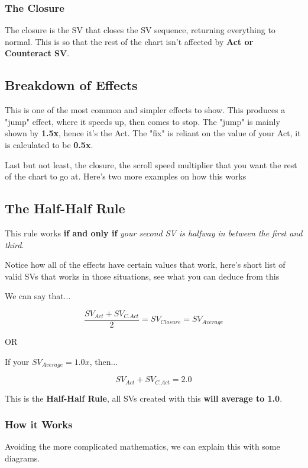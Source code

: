 \subsubsection{The Closure}
The closure is the SV that closes the SV sequence, returning everything to normal. This is so that the rest of the chart isn't affected by \textbf{Act or Counteract SV}.

\subsection{Breakdown of Effects}



This is one of the most common and simpler effects to show. This produces a "jump" effect, where it speeds up, then comes to stop. The "jump" is mainly shown by \textbf{1.5x}, hence it's the Act. The "fix" is reliant on the value of your Act, it is calculated to be \textbf{0.5x}.

Last but not least, the closure, the scroll speed multiplier that you want the rest of the chart to go at. \newline
Here's two more examples on how this works




\subsection{The Half-Half Rule}

This rule works \textbf{if and only if} \textit{your second SV is halfway in between the first and third}.

Notice how all of the effects have certain values that work, here's short list of valid SVs that works in those situations, see what you can deduce from this



We can say that...

\[ \frac{SV_{Act} + SV_{C.Act}}{2} = SV_{Closure} = SV_{Average} \]

OR

If your $SV_{Average} = 1.0x$, then...

\[ SV_{Act} + SV_{C.Act} = 2.0 \]

This is the \textbf{Half-Half Rule}, all SVs created with this \textbf{will average to 1.0}. 
\newpage

\subsubsection{How it Works}
Avoiding the more complicated mathematics, we can explain this with some diagrams.

